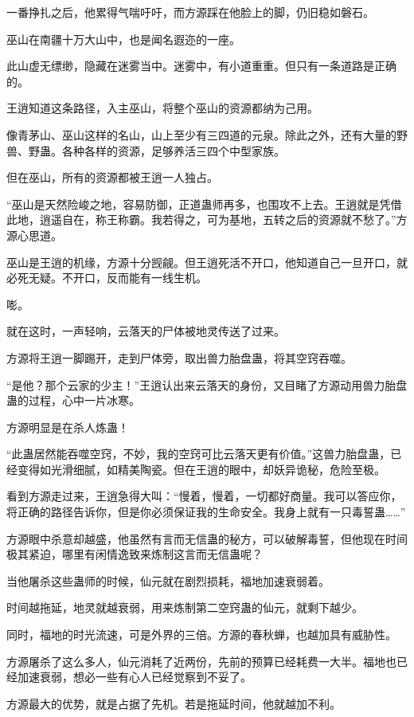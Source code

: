 \begin{this_body}
一番挣扎之后，他累得气喘吁吁，而方源踩在他脸上的脚，仍旧稳如磐石。

巫山在南疆十万大山中，也是闻名遐迩的一座。

此山虚无缥缈，隐藏在迷雾当中。迷雾中，有小道重重。但只有一条道路是正确的。

王逍知道这条路径，入主巫山，将整个巫山的资源都纳为己用。

像青茅山、巫山这样的名山，山上至少有三四道的元泉。除此之外，还有大量的野兽、野蛊。各种各样的资源，足够养活三四个中型家族。

但在巫山，所有的资源都被王逍一人独占。

“巫山是天然险峻之地，容易防御，正道蛊师再多，也围攻不上去。王逍就是凭借此地，逍遥自在，称王称霸。我若得之，可为基地，五转之后的资源就不愁了。”方源心思道。

巫山是王逍的机缘，方源十分觊觎。但王逍死活不开口，他知道自己一旦开口，就必死无疑。不开口，反而能有一线生机。

嘭。

就在这时，一声轻响，云落天的尸体被地灵传送了过来。

方源将王逍一脚踢开，走到尸体旁，取出兽力胎盘蛊，将其空窍吞噬。

“是他？那个云家的少主！”王逍认出来云落天的身份，又目睹了方源动用兽力胎盘蛊的过程，心中一片冰寒。

方源明显是在杀人炼蛊！

“此蛊居然能吞噬空窍，不妙，我的空窍可比云落天更有价值。”这兽力胎盘蛊，已经变得如光滑细腻，如精美陶瓷。但在王逍的眼中，却妖异诡秘，危险至极。

看到方源走过来，王逍急得大叫：“慢着，慢着，一切都好商量。我可以答应你，将正确的路径告诉你，但是你必须保证我的生命安全。我身上就有一只毒誓蛊……”

方源眼中杀意却越盛，他虽然有言而无信蛊的秘方，可以破解毒誓，但他现在时间极其紧迫，哪里有闲情逸致来炼制这言而无信蛊呢？

当他屠杀这些蛊师的时候，仙元就在剧烈损耗，福地加速衰弱着。

时间越拖延，地灵就越衰弱，用来炼制第二空窍蛊的仙元，就剩下越少。

同时，福地的时光流速，可是外界的三倍。方源的春秋蝉，也越加具有威胁性。

方源屠杀了这么多人，仙元消耗了近两份，先前的预算已经耗费一大半。福地也已经加速衰弱，想必一些有心人已经觉察到不妥了。

方源最大的优势，就是占据了先机。若是拖延时间，他就越加不利。


\end{this_body}
